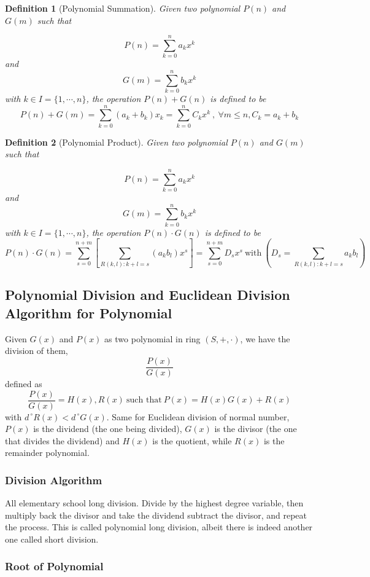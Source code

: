 \documentclass{book}
\newtheorem{Definition}{Definition}[section]
\numberwithin{identity}{subsection}
\numberwithin{Rule}{subsection}
\numberwithin{Theorem}{subsection}
\numberwithin{Definition}{subsection}
\begin{document}
\begin{Definition}[Polynomial Summation]
    Given two polynomial $P(n)$ and $G(m)$ such that 
    
    $$P(n)=\sum\limits^{n}_{k=0}a_{k}x^{k}$$ and $$G(m)=\sum\limits^{n}_{k=0}b_{k}x^{k}$$ with $k\in I =\{1,\cdots,n\}$, the operation $P(n)+G(n)$ is defined to be $$P(n)+G(m)= \sum\limits_{k=0}^{n}(a_{k}+b_{k})x_{k}=\sum\limits_{k=0}^{n} C_{k}x^{k}\:, \: \forall m \leq n, C_{k}= a_{k}+b_{k}$$
\end{Definition}

\begin{Definition}[Polynomial Product]
    Given two polynomial $P(n)$ and $G(m)$ such that
    
    $$P(n)=\sum\limits^{n}_{k=0}a_{k}x^{k}$$ and $$G(m)=\sum\limits^{n}_{k=0}b_{k}x^{k}$$ with $k\in I =\{1,\cdots,n\}$, the operation $P(n)\cdot G(n)$ is defined to be $$P(n)\cdot G(n)= \sum\limits^{n+m}_{s=0}\left[\sum\limits_{R(k,l): k + l = s} (a_{k}b_{l})x^{s}\right] = \sum\limits_{s=0}^{n+m} D_{s} x^{s} \: \text{with} \: \left(D_{s}= \sum\limits_{R(k,l): k+l = s} a_{k}b_{l}\right) $$
\end{Definition}

\subsection{Polynomial Division and Euclidean Division Algorithm for Polynomial}

Given $G(x)$ and $P(x)$ as two polynomial in ring $(S,+,\cdot)$, we have the division of them, $$\frac{P(x)}{G(x)}$$ defined as $$\frac{P(x)}{G(x)}= H(x), R(x) \: \text{such that}\: P(x) = H(x)G(x) + R(x) $$ with $d^{\:\circ}R(x)< d^{\:\circ}G(x)$. Same for Euclidean division of normal number, $P(x)$ is the dividend (the one being divided), $G(x)$ is the divisor (the one that divides the dividend) and $H(x)$ is the quotient, while $R(x)$ is the remainder polynomial. 

\subsubsection{Division Algorithm}

All elementary school long division. Divide by the highest degree variable, then multiply back the divisor and take the dividend subtract the divisor, and repeat the process. This is called polynomial long division, albeit there is indeed another one called short division.

\subsubsection{Root of Polynomial}
\end{document}
